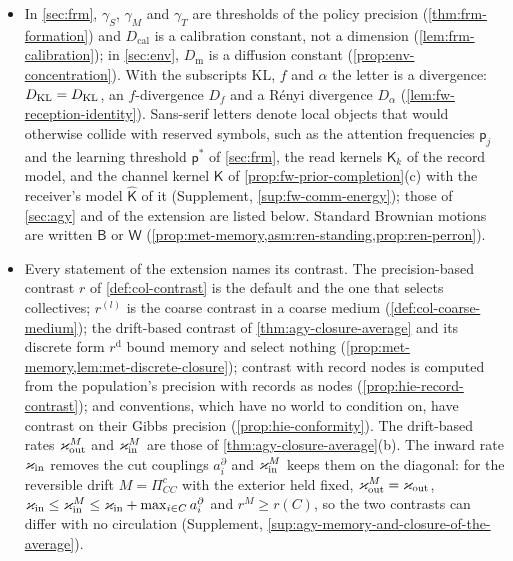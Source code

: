\begin{itemize}
\item In \cref{sec:frm}, $\gamma_S$, $\gamma_M$ and $\gamma_T$ are thresholds of the policy precision (\cref{thm:frm-formation}) and $D_{\mathrm{cal}}$ is a calibration constant, not a dimension (\cref{lem:frm-calibration}); in \cref{sec:env}, $D_{\mathrm m}$ is a diffusion constant (\cref{prop:env-concentration}). With the subscripts $\mathrm{KL}$, $f$ and $\alpha$ the letter is a divergence: $D_{\mathrm{KL}}=D_{\mathrm{KL}}$, an $f$-divergence $D_f$ and a R\'enyi divergence $D_\alpha$ (\cref{lem:fw-reception-identity}). Sans-serif letters denote local objects that would otherwise collide with reserved symbols, such as the attention frequencies $\mathsf p_j$ and the learning threshold $\mathsf p^\ast$ of \cref{sec:frm}, the read kernels $\mathsf K_k$ of the record model, and the channel kernel $\mathsf K$ of \cref{prop:fw-prior-completion}(c) with the receiver's model $\hat{\mathsf K}$ of it (Supplement, \cref{sup:fw-comm-energy}); those of \cref{sec:agy} and of the extension are listed below. Standard Brownian motions are written $\mathsf B$ or $\mathsf W$ (\cref{prop:met-memory,asm:ren-standing,prop:ren-perron}).
\item Every statement of the extension names its contrast. The precision-based contrast $r$ of \cref{def:col-contrast} is the default and the one that selects collectives; $r^{(l)}$ is the coarse contrast in a coarse medium (\cref{def:col-coarse-medium}); the drift-based contrast of \cref{thm:agy-closure-average} and its discrete form $r^{\mathrm d}$ bound memory and select nothing (\cref{prop:met-memory,lem:met-discrete-closure}); contrast with record nodes is computed from the population's precision with records as nodes (\cref{prop:hie-record-contrast}); and conventions, which have no world to condition on, have contrast on their Gibbs precision (\cref{prop:hie-conformity}). The drift-based rates $\varkappa_{\mathrm{out}}^M$ and $\varkappa_{\mathrm{in}}^M$ are those of \cref{thm:agy-closure-average}(b). The inward rate $\varkappa_{\mathrm{in}}$ removes the cut couplings $a^\partial_i$ and $\varkappa_{\mathrm{in}}^M$ keeps them on the diagonal: for the reversible drift $M=\Pi^c_{CC}$ with the exterior held fixed, $\varkappa_{\mathrm{out}}^M=\varkappa_{\mathrm{out}}$, $\varkappa_{\mathrm{in}}\le\varkappa_{\mathrm{in}}^M\le\varkappa_{\mathrm{in}}+\max_{i\in C}a^\partial_i$ and $r^M\ge r(C)$, so the two contrasts can differ with no circulation (Supplement, \cref{sup:agy-memory-and-closure-of-the-average}).

\end{itemize}
